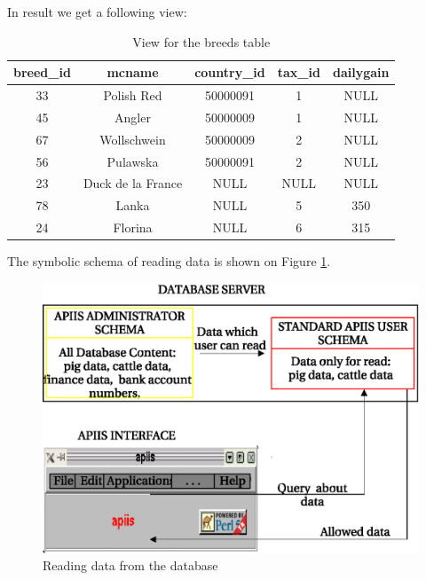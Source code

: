 \begin{enumerate}
\begin{verbatim}
\end{verbatim}
In result we get a following view:
\begin{center}
\begin{table}[h]
\begin{center}
\begin{tabular}{|c|c|c|c|c|}
\hline breed\_id & mcname & country\_id & tax\_id & dailygain\\
\hline
\hline 33 & Polish Red & 50000091 & 1 & NULL \\
\hline 45 & Angler     & 50000009 & 1 & NULL \\
\hline 67 & Wollschwein& 50000009 & 2 & NULL \\
\hline 56 & Pulawska   & 50000091 & 2 & NULL \\
\hline 23 & Duck de la France & NULL & NULL & NULL \\
\hline 78 & Lanka & NULL & 5 & 350 \\
\hline 24 & Florina & NULL & 6 & 315 \\
\hline
\end{tabular}
\end{center}
\caption{View for the breeds table} \label{breedviewexample}
\end{table}
\end{center}

The symbolic schema of reading data is shown on Figure \ref{fig:readingdata}.
\begin{figure}[h]
\begin{center}%
   \includegraphics[scale=1]{./access-control/readingdata.eps}
   \caption{Reading data from the database}
   \label{fig:readingdata}
\end{center}
\end{figure}

\end{enumerate}

